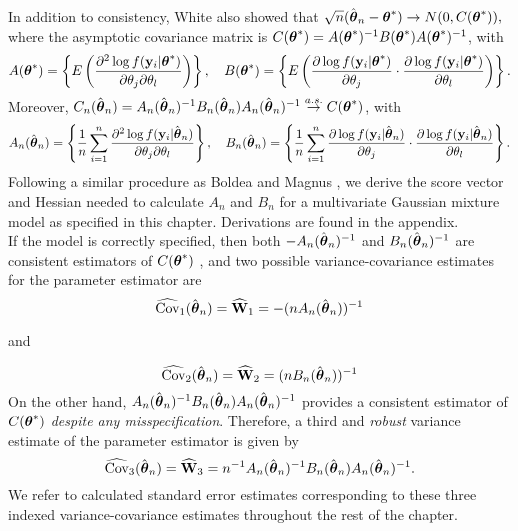 In addition to consistency, White \cite{white1982} also showed that $\sqrt{n}(\hat{\boldsymbol\theta}_{n}-\boldsymbol\theta^{*})\rightarrow N(0, C(\boldsymbol\theta^{*})),$ where the asymptotic covariance matrix is
$C(\boldsymbol\theta^{*})=A(\boldsymbol\theta^{*})^{-1}B(\boldsymbol\theta^{*})A(\boldsymbol\theta^{*})^{-1}$, with
$$A(\boldsymbol\theta^{*})=\left\{E\left(\frac{\partial^{2}\log f(\mathbf y_{i}|\boldsymbol\theta^{*})}{\partial \theta_{j}\partial\theta_{l}}\right)\right\},\quad B(\boldsymbol\theta^{*})=\left\{E\left(\frac{\partial\log f(\mathbf y_{i}|\boldsymbol\theta^{*})}{\partial \theta_{j}}\cdot \frac{\partial\log f(\mathbf y_{i}|\boldsymbol\theta^{*})}{\partial \theta_{l}}\right)\right\}.$$
Moreover, $C_{n}(\hat{\boldsymbol\theta}_{n})=A_{n}(\hat{\boldsymbol\theta}_{n})^{-1}B_{n}(\hat{\boldsymbol\theta}_{n})A_{n}(\hat{\boldsymbol\theta}_{n})^{-1}\stackrel{a.s.}{\rightarrow} C(\boldsymbol\theta^{*})$, with
$$A_{n}(\hat{\boldsymbol\theta}_{n})=\left\{\frac{1}{n}\sum^{n}_{i=1}\frac{\partial^{2}\log f(\mathbf y_{i}|\hat{\boldsymbol\theta}_{n})}{\partial \theta_{j}\partial\theta_{l}}\right\},\quad B_{n}(\hat{\boldsymbol\theta}_{n})=\left\{\frac{1}{n}\sum^{n}_{i=1}\frac{\partial\log f(\mathbf y_{i}|\hat{\boldsymbol\theta}_{n})}{\partial \theta_{j}}\cdot \frac{\partial\log f(\mathbf y_{i}|\hat{\boldsymbol\theta}_{n})}{\partial \theta_{l}}\right\}.$$
 Following a similar procedure as Boldea and Magnus \cite{boldea2009}, we derive the score vector and Hessian needed to calculate $A_{n}$ and $B_{n}$ for a multivariate Gaussian mixture model as specified in this chapter. Derivations are found in the appendix.\\
 
If the model is correctly specified, then both $-A_{n}(\hat{\boldsymbol\theta}_{n})^{-1}$ and $B_{n}(\hat{\boldsymbol\theta}_{n})^{-1}$ are consistent estimators of $C(\boldsymbol\theta^{*})$ \cite{white1982}, and two possible variance-covariance estimates for the parameter estimator are
$$\widehat{\text{Cov}}_{1}(\hat{\boldsymbol\theta}_{n}) = \widehat{\mathbf W}_{1}=-(nA_{n}(\hat{\boldsymbol\theta}_{n}))^{-1}$$
\begin{center}and\end{center}
$$\widehat{\text{Cov}}_{2}(\hat{\boldsymbol\theta}_{n})= \widehat{\mathbf W}_{2}=(nB_{n}(\hat{\boldsymbol\theta}_{n}))^{-1}$$
On the other hand, $A_{n}(\hat{\boldsymbol\theta}_{n})^{-1}B_{n}(\hat{\boldsymbol\theta}_{n})A_{n}(\hat{\boldsymbol\theta}_{n})^{-1}$ provides a consistent estimator of $C(\boldsymbol\theta^{*})$ {\em despite any misspecification}. Therefore, a third and {\em robust} variance estimate of the parameter estimator is given by
$$\widehat{\text{Cov}}_{3}(\hat{\boldsymbol\theta}_{n})= \widehat{\mathbf W}_{3}=n^{-1}A_{n}(\hat{\boldsymbol\theta}_{n})^{-1}B_{n}(\hat{\boldsymbol\theta}_{n})A_{n}(\hat{\boldsymbol\theta}_{n})^{-1}.$$
 We refer to calculated standard error estimates corresponding to these three indexed variance-covariance estimates throughout the rest of the chapter.
